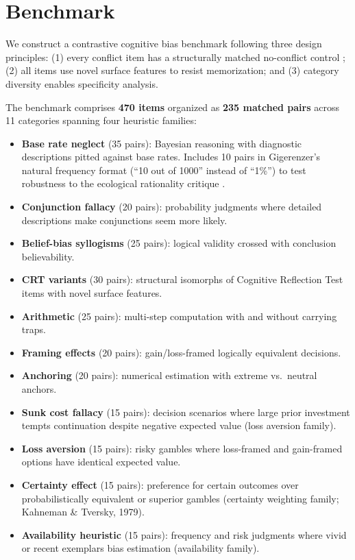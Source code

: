 \documentclass[twocolumn,10pt]{article}
\begin{document}

\section{Benchmark}
\label{sec:benchmark}

We construct a contrastive cognitive bias benchmark following three
design principles: (1) every conflict item has a structurally matched
no-conflict control \citep{deneys2012bias}; (2) all items use novel
surface features to resist memorization; and (3) category diversity
enables specificity analysis.

The benchmark comprises \textbf{470 items} organized as \textbf{235
matched pairs} across 11 categories spanning four heuristic families:

\begin{itemize}[leftmargin=*,itemsep=1pt]
  \item \textbf{Base rate neglect} (35 pairs): Bayesian reasoning with
  diagnostic descriptions pitted against base rates.  Includes 10 pairs
  in Gigerenzer's natural frequency format (``10 out of 1000'' instead
  of ``1\%'') to test robustness to the ecological rationality critique
  \citep{gigerenzer1995improve}.
  \item \textbf{Conjunction fallacy} (20 pairs): probability judgments
  where detailed descriptions make conjunctions seem more likely.
  \item \textbf{Belief-bias syllogisms} (25 pairs): logical validity
  crossed with conclusion believability.
  \item \textbf{CRT variants} (30 pairs): structural isomorphs of
  Cognitive Reflection Test items with novel surface features.
  \item \textbf{Arithmetic} (25 pairs): multi-step computation with
  and without carrying traps.
  \item \textbf{Framing effects} (20 pairs): gain/loss-framed logically
  equivalent decisions.
  \item \textbf{Anchoring} (20 pairs): numerical estimation with
  extreme vs.\ neutral anchors.
  \item \textbf{Sunk cost fallacy} (15 pairs): decision scenarios where
  large prior investment tempts continuation despite negative expected
  value (loss aversion family).
  \item \textbf{Loss aversion} (15 pairs): risky gambles where
  loss-framed and gain-framed options have identical expected value.
  \item \textbf{Certainty effect} (15 pairs): preference for certain
  outcomes over probabilistically equivalent or superior gambles
  (certainty weighting family; Kahneman \& Tversky, 1979).
  \item \textbf{Availability heuristic} (15 pairs): frequency and risk
  judgments where vivid or recent exemplars bias estimation
  (availability family).
\end{itemize}
\end{document}
